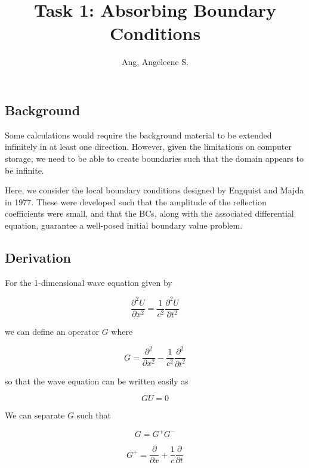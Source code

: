 \documentclass{article}
\title{Task 1: Absorbing Boundary
Conditions}
\author{Ang, Angeleene S.}
\begin{document}
    
    
    \maketitle
    
    

\subsection*{Background}\label{background}

Some calculations would require the background material to be extended
infinitely in at least one direction. However, given the limitations on
computer storage, we need to be able to create boundaries such that the
domain appears to be infinite.

Here, we consider the local boundary conditions designed by Engquist and
Majda in 1977. These were developed such that the amplitude of the
reflection coefficients were small, and that the BCs, along with the
associated differential equation, guarantee a well-posed initial
boundary value problem.

    \subsection*{Derivation}\label{derivation}

For the 1-dimensional wave equation given by

\begin{equation}
\dfrac{\partial^2 U}{\partial x^2} = \dfrac{1}{c^2} \dfrac{\partial^2 U}{\partial t^2} 
\end{equation}

we can define an operator \(G\) where

\begin{equation}
G = \dfrac{\partial^2}{\partial x^2} - \dfrac{1}{c^2} \dfrac{\partial^2}{\partial t^2} 
\end{equation}

so that the wave equation can be written easily as

\begin{equation}
GU = 0
\end{equation}

We can separate \(G\) such that

\begin{equation}
G = G^+ G^-
\end{equation}

\begin{equation}
G^+ = \dfrac{\partial}{\partial x} + \dfrac{1}{c} \dfrac{\partial}{\partial t}
\end{equation}
\end{document}
